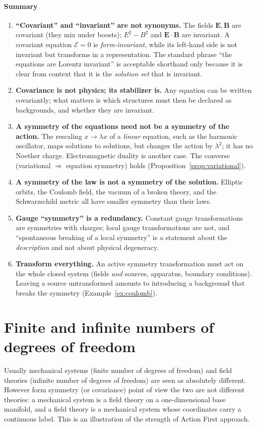 \paragraph{Summary}
\begin{enumerate}
    \item \textbf{``Covariant'' and ``invariant'' are not synonyms.} The fields
  ${\bm{E}},{\bm{B}}$ are covariant (they mix under boosts); $E^2-B^2$ and
  ${\bm{E}}\!\cdot\!{\bm{B}}$ are invariant. A covariant equation $\mathcal E=0$ is
  \emph{form-invariant}, while its left-hand side is not invariant but
  transforms in a representation. The standard phrase ``the equations are
  Lorentz invariant'' is acceptable shorthand only because it is clear from
  context that it is the \emph{solution set} that is invariant.
\item \textbf{Covariance is not physics; its stabilizer is.} Any equation can
  be written covariantly; what matters is
  which structures must then be declared as backgrounds, and whether they are
  invariant.
\item \textbf{A symmetry of the equations need not be a symmetry of the action.}
  The rescaling $x\to\lambda x$ of a \emph{linear} equation, such as the
  harmonic oscillator, maps solutions to solutions, but changes the action by
  $\lambda^2$; it has no Noether charge. Electromagnetic duality is another case.
  The converse (variational $\Rightarrow$ equation symmetry) holds
  (Proposition~\ref{prop:variational}).
\item \textbf{A symmetry of the law is not a symmetry of the solution.}
  Elliptic orbits, the Coulomb field, the vacuum of a broken theory, and the
  Schwarzschild metric all have smaller symmetry than their laws.
\item \textbf{Gauge ``symmetry'' is a redundancy.} Constant gauge
  transformations are symmetries with charges; local gauge transformations are
  not, and ``spontaneous breaking of a local symmetry'' is a statement about
  the \emph{description} and not about physical degeneracy.
\item \textbf{Transform everything.} An active symmetry transformation must act on
  the whole closed system (fields \emph{and} sources, apparatus,
  boundary conditions). Leaving a source untransformed amounts to introducing a
  background that breaks the symmetry (Example~\ref{ex:coulomb}).
\end{enumerate}

\section{Finite and infinite numbers of degrees of freedom}
\label{sec:cm-dof}
Usually mechanical systems (finite number of degrees of freedom) 
and field theories (infinite number of degrees of freedom) are seen
as absolutely different. However form symmetry (or covariance) point
of view the two are
not different theories: a mechanical system is a field theory on a
one-dimensional base manifold, and a field theory is a mechanical system whose
coordinates carry a continuous label. This is an illustration of the strength
of Action First approach.

